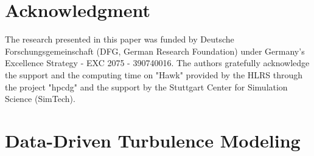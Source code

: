 





\section*{Acknowledgment} %
The research presented in this paper was funded by Deutsche Forschungsgemeinschaft (DFG, German Research Foundation) under Germany's Excellence Strategy - EXC 2075 - 390740016.
The authors gratefully acknowledge the support and the computing time on "Hawk" provided by the HLRS through the project "hpcdg" and the support by the Stuttgart Center for Simulation Science (SimTech).
\appendix









\section{Data-Driven Turbulence Modeling}
\label{sec:turbulence}


